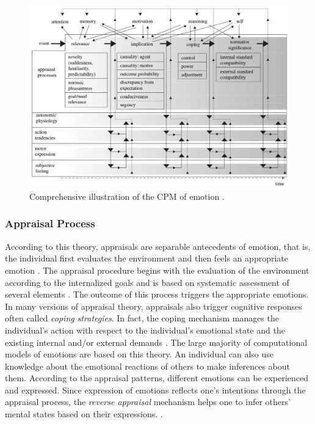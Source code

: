 \documentclass[12pt]{report}
\begin{document}
\begin{figure}[tbh]
  \center
  \includegraphics[width=\textwidth]{figure/comprehensive-CPM.png}
  \caption{Comprehensive illustration of the CPM of emotion
  \cite{scherer:dynamic-architecture-emotion,scherer:appraisal-processes}.}
  \label{fig:comp-cpm}
\end{figure}

\subsubsection{Appraisal Process}
\label{sec:appraisal-process}

According to this theory, appraisals are separable antecedents of emotion, that
is, the individual first evaluates the environment and then feels an appropriate
emotion \cite{scherer:appraisal-processes}. The appraisal procedure begins with
the evaluation of the environment according to the internalized goals and is
based on systematic assessment of several elements
\cite{scherer:sequential-appraisal-process}. The outcome of this process
triggers the appropriate emotions. In many versions of appraisal theory,
appraisals also trigger cognitive responses often called \textit{coping
strategies}. In fact, the coping mechanism manages the individual's action with
respect to the individual's emotional state and the existing internal and/or
external demands \cite{folkman:coping-pitfalls-promise}. The large majority of
computational models of emotions are based on this theory. An individual can
also use knowledge about the emotional reactions of others to make inferences
about them. According to the appraisal patterns, different emotions can be
experienced and expressed. Since expression of emotions reflects one's
intentions through the appraisal process, the \textit{reverse appraisal}
mechanism helps one to infer others' mental states based on their expressions.
\cite{gratch:reverse-appraisal, hareli:emotional-reaction-perception}.
\end{document}
